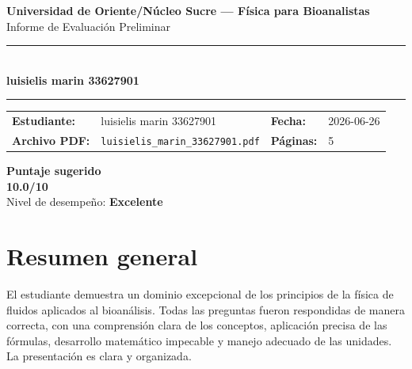 \documentclass[11pt,a4paper]{article}
\begin{document}
\begin{center}
  {\Large\bfseries\color{azulTitulo} Universidad de Oriente/Núcleo Sucre --- Física para Bioanalistas}\\[4pt]
  {\large Informe de Evaluación Preliminar}\\[12pt]
  \rule{\linewidth}{1.2pt}\\[6pt]
  {\LARGE\bfseries luisielis marin 33627901}\\[4pt]
  \rule{\linewidth}{0.6pt}
\end{center}

\vspace{4pt}
\begin{tcolorbox}[cajaTitulo, title=Datos del informe]
\begin{tabular}{@{}llll@{}}
  \textbf{Estudiante:}  & luisielis marin 33627901  &
  \textbf{Fecha:}       & 2026-06-26 \\[4pt]
  \textbf{Archivo PDF:} & \texttt{luisielis\_marin\_33627901.pdf}  &
  \textbf{Páginas:}     & 5 \\
\end{tabular}
\end{tcolorbox}

\vspace{6pt}
\begin{center}
  \begin{tcolorbox}[
    enhanced,
    colback=white, colframe=desempeno_excelente,
    width=0.62\linewidth,
    boxrule=2pt,
    halign=center, valign=center,
    top=8pt, bottom=8pt,
  ]
    \centering
    {\large\bfseries Puntaje sugerido}\\[6pt]
    {\Huge\bfseries\color{desempeno_excelente} 10.0/10}\\[6pt]
    {\large Nivel de desempeño: \textbf{\color{desempeno_excelente} Excelente}}
  \end{tcolorbox}
\end{center}

\section*{Resumen general}
El estudiante demuestra un dominio excepcional de los principios de la física de fluidos aplicados al bioanálisis. Todas las preguntas fueron respondidas de manera correcta, con una comprensión clara de los conceptos, aplicación precisa de las fórmulas, desarrollo matemático impecable y manejo adecuado de las unidades. La presentación es clara y organizada.
\end{document}
